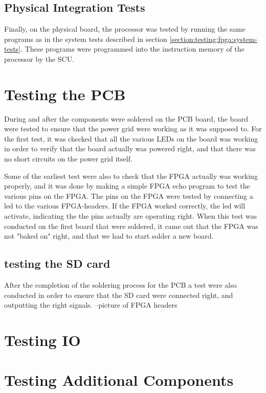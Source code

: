 \subsection{Physical Integration Tests}

Finally, on the physical board, the processor was tested by running the same programs as in the system tests described in section \vref{section:testing:fpga:system-tests}.
These programs were programmed into the instruction memory of the processor by the SCU.

\section{Testing the PCB}
During and after the components were soldered on the PCB board, the board were tested to ensure that the power grid were working as it was supposed to.
For the first test, it was checked that all the various LEDs on the board was working in order to verify that the board actually was powered right, and that there was
no short circuits on the power grid itself.

Some of the earliest test were also to check that the FPGA actually was working properly, and it was done by making a simple FPGA echo program to test the various pins on the FPGA.
The pins on the FPGA were tested by connecting a led to the various FPGA-headers. If the FPGA worked correctly, the led will activate, indicating the the pins actually are operating right.
When this test was conducted on the first board that were soldered, it came out that the FPGA was not "baked on" right, and that we had to start solder a new board. 

\subsection{testing the SD card}
After the completion of the soldering process for the PCB a test were also conducted in order to ensure that the 
SD card were connected right, and outputting the right signals. 
--picture of FPGA headers

\section{Testing IO}


\section{Testing Additional Components}

